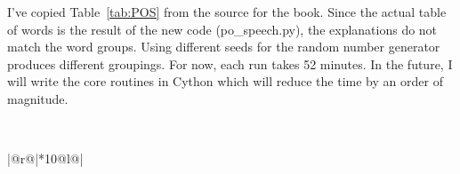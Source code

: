 \documentclass[prelim,showlabels]{book}
\newcommand{\plotsize}{\small}
\begin{document}
I've copied Table~\ref{tab:POS} from the source for the book.  Since
the actual table of words is the result of the new code
(po\_speech.py), the explanations do not match the word groups.  Using
different seeds for the random number generator produces different
groupings.  For now, each run takes 52 minutes.  In the future, I will
write the core routines in Cython which will reduce the time by an order of
magnitude.
\begin{table}[htb]
  \caption[Words most frequently associated with each state.]%
  {Words most frequently associated with each state.  While I have no
    interpretation for three of the states, some of the following
    interpretations of the other states are strikingly successful.}
  \begin{center}{\plotsize%
      \\[2.0ex]
      \begin{tabular}{|@{\hspace{0.10em}}r@{\hspace{0.40em}}|*{10}{@{\hspace{0.28em}}l@{\hspace{0.28em}}}|}
        \hline  [0.5ex]
        \hline
      \end{tabular}
    }\end{center}
  \label{tab:POS}
\end{table}
\end{document}
